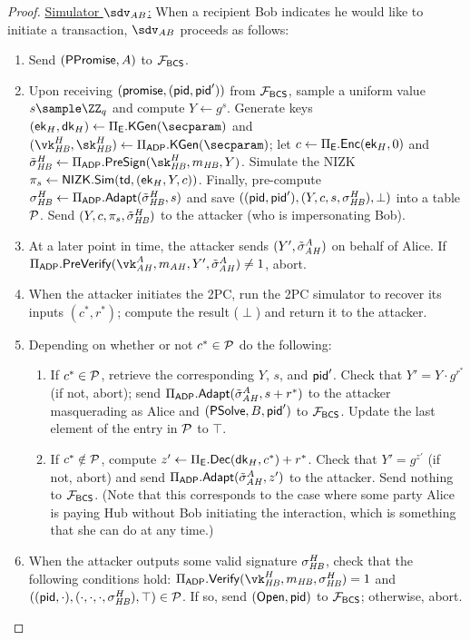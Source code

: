 \begin{proof}
\smallskip
\noindent\underline{Simulator $\Sim_{AB}$:} When a recipient Bob indicates he would like to initiate a transaction, $\Sim_{AB}$ proceeds as follows:
\begin{enumerate}
    \item Send $(\mathsf{PPromise}, A)$ to $\mathcal{F}_{\mathsf{BCS}}$.
    \item Upon receiving $(\mathsf{promise}, (\mathsf{pid},\mathsf{pid}'))$ from $\mathcal{F}_{\mathsf{BCS}}$, sample a uniform value $s \sample \ZZ_q$ and compute $Y \gets g^s$. Generate keys $(\ek_H,\dk_H) \gets \Pi_\ENC.\kgen(\secparam)$ and $(\vk_\hb^H, \sk_\hb^H) \gets \Pi_\ADP.\kgen(\secparam)$; let $c \gets \Pi_{\mathsf{E}}.{\mathsf{Enc}}(\mathsf{ek}_H, 0)$ and $\presig_\hb^H \gets \Pi_\ADP.\presign(\sk_\hb^H, m_\hb, Y)$. Simulate the NIZK $\pi_s \gets \mathsf{NIZK}.\mathsf{Sim}(\mathsf{td},\allowbreak (\mathsf{ek}_H, Y,c))$. Finally, pre-compute $\sigma_{\mathit{HB}}^H \gets \Pi_{\mathsf{ADP}}.\mathsf{Adapt}(\tilde{\sigma}_{\mathit{HB}}^H, s)$ and save $((\mathsf{pid},\mathsf{pid}'),(Y,c,s,\sigma_{\mathit{HB}}^H),\perp)$ into a table $\mathcal{P}$. Send $(Y,c,\pi_s,\tilde{\sigma}_{\mathit{HB}}^H)$ to the attacker (who is impersonating Bob).
    \item At a later point in time, the attacker sends $(Y', \tilde{\sigma}_{\mathit{AH}}^A)$ on behalf of Alice. If $\Pi_\ADP.\prevrfy(\vk_\ah^A, m_\ah, Y', \presig_\ah^A) \neq 1$, abort.
    \item When the attacker initiates the 2PC, run the 2PC simulator to recover its inputs $(c^*, r^*)$; compute the result ($\perp$) and return it to the attacker.
    \item Depending on whether or not $c^* \in \mathcal{P}$ do the following:
    \begin{enumerate}
        \item If $c^*\in\mathcal{P}$, retrieve the corresponding $Y$, $s$, and $\mathsf{pid}'$. Check that $Y' = Y \cdot g^{r^*}$ (if not, abort); send $\Pi_{\mathsf{ADP}}.\mathsf{Adapt}(\tilde{\sigma}_{\mathit{AH}}^A, s+r^*)$ to the attacker masquerading as Alice and $(\mathsf{PSolve}, B, \mathsf{pid}')$ to $\mathcal{F}_{\mathsf{BCS}}$. Update the last element of the entry in $\mathcal{P}$ to $\top$.
        \item If $c^* \notin \mathcal{P}$, compute $z' \gets \Pi_{\mathsf{E}}.{\mathsf{Dec}}(\mathsf{dk}_H, c^*) + r^*$. Check that $Y' = g^{z'}$ (if not, abort) and send $\Pi_{\mathsf{ADP}}.\mathsf{Adapt}(\tilde{\sigma}_{\mathit{AH}}^A, z')$ to the attacker. Send nothing to $\mathcal{F}_{\mathsf{BCS}}$. (Note that this corresponds to the case where some party Alice is paying Hub without Bob initiating the interaction, which is something that she can do at any time.)
    \end{enumerate}
    \item When the attacker outputs some valid signature $\sigma_{\mathit{HB}}^H$, check that the following conditions hold: $\Pi_\ADP.\vrfy(\vk_\hb^H, m_\hb, \sigma_\hb^H)=1$ and $((\mathsf{pid},\cdot),\allowbreak(\cdot, \cdot, \cdot, \sigma_{\mathit{HB}}^H),\top) \in \mathcal{P}$. If so, send $(\mathsf{Open}, \mathsf{pid})$ to $\mathcal{F}_{\mathsf{BCS}}$; otherwise, abort.
\end{enumerate}


\end{proof}
